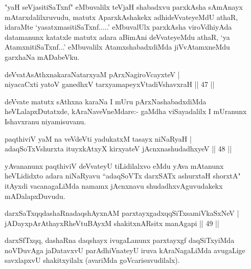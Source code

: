 \begin{artha}
"yaH seVjasitiSaTxnf" eMbuvalilx teVjaH shabadxvu parxkAsha sAmAnayx mAtarxdalilxruvudu, matutx AparxkAshakekx adhideVvateyeMdU athaR, idaraMte `yasatxmasitiSaTxnf.....' eMbuvalUlx parxkAsha viroVdhiyAda datamanunx katatxle matutx adara aBimAni deVvateyeMdu athaR, `ya AtamxnitiSaTxnf...' eMbuvalilx AtamxshabadxdiMda jiVvAtamxneMdu garxhaNa mADabeVku.
\end{artha}%


\begin{shl}
deVvatAsAthxnakaraNatarxyaM pArxNagiroVcayxteV |\\
niyacaCxti yatoV ganedhxV tarxyamapeyxVtadiVshavxraH \hfill || 47 ||
\end{shl}

\begin{artha}
deVvate matutx sAthxna karaNa I mUru pArxNashabadxdiMda heVLalapxDutatxde, kAraNaveVneMdare:- gaMdha viSayadalilx I mUranunx Ishavxranu niyamisuvanu.
\end{artha}


\begin{shl}
paqthiviV yaM na veVdeVti yadukatxM tasayx niNaRyaH |\\
adaqSoTxV\s shurxta ituyxkAtxyX kirxyateV jAcnxnashudadhxyeV \hfill || 48 ||
\end{shl}

\begin{artha}
yAvananunx paqthiviV deVvateyU tiLidilalxvo eMdu yAva mAtanunx heVLididxto adara niNaRyavu ``adaqSoVTx darxSATx ashurxtaH shorxtA" itAyxdi vacanagaLiMda namamx jAcnxnavu shudadhxvAguvudakekx mADalapxDuvudu.
\end{artha}


\begin{shl}
darxSaTxqqdashaRnadaqshAyxnAM parxtayxgadxqqSiTxsamiVkaSxNeV |\\
jADayxpArAthayxRheVtuBAyxM shakitxnARsitx manAgapi \hfill || 49 ||
\end{shl}

\begin{artha}
darxSfTxqq, dashaRna daqshayx ivugaLanunx parxtayxgf daqSiTxyiMda noVDuvAga jaDatavxvU parAdhiVnateyU iruva kAraNagaLiMda avugaLige savxlapxvU shakitxyilalx (avariMda goVcarisuvudilalx).
\end{artha}

